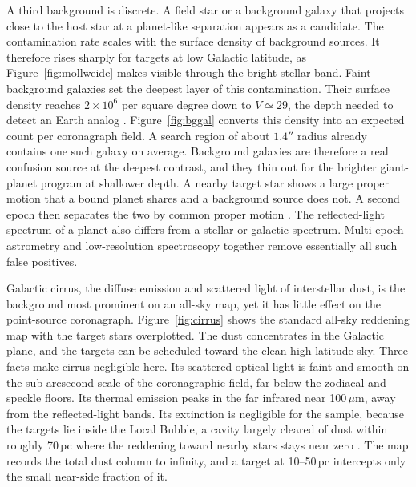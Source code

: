 A third background is discrete. A field star or a background galaxy that
projects close to the host star at a planet-like separation appears as a
candidate. The contamination rate scales with the surface density of
background sources. It therefore rises sharply for targets at low
Galactic latitude, as Figure~\ref{fig:mollweide} makes visible through
the bright stellar band. Faint background galaxies set the deepest layer
of this contamination. Their surface density reaches $2\times10^{6}$ per
square degree down to $V\simeq29$, the depth needed to detect an Earth
analog \cite{williams96}. Figure~\ref{fig:bggal} converts this density
into an expected count per coronagraph field. A search region of about
$1.4''$ radius already contains one such galaxy on average. Background
galaxies are therefore a real confusion source at the deepest contrast,
and they thin out for the brighter giant-planet program at shallower
depth. A nearby target star shows a large proper motion that a bound
planet shares and a background source does not. A second epoch then
separates the two by common proper motion \cite{bowler16}. The
reflected-light spectrum of a planet also differs from a stellar or
galactic spectrum. Multi-epoch astrometry and low-resolution
spectroscopy together remove essentially all such false positives.

Galactic cirrus, the diffuse emission and scattered light of
interstellar dust, is the background most prominent on an all-sky map,
yet it has little effect on the point-source coronagraph.
Figure~\ref{fig:cirrus} shows the standard all-sky reddening map
\cite{sfd98} with the target stars overplotted. The dust concentrates
in the Galactic plane, and the targets can be scheduled toward the clean
high-latitude sky. Three facts make cirrus negligible here. Its
scattered optical light is faint and smooth on the sub-arcsecond scale
of the coronagraphic field, far below the zodiacal and speckle floors.
Its thermal emission peaks in the far infrared near 100\,$\mu$m, away
from the reflected-light bands. Its extinction is negligible for the
sample, because the targets lie inside the Local Bubble, a cavity
largely cleared of dust within roughly 70\,pc where the reddening toward
nearby stars stays near zero \cite{lallement19}. The map records the
total dust column to infinity, and a target at 10--50\,pc intercepts
only the small near-side fraction of it.

